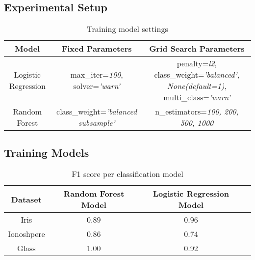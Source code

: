 \documentclass[english]{tktltiki2}
\theoremstyle{definition}
\theoremstyle{remark}
\begin{document}
\subsection{Experimental Setup}

\begin{table}[H]
	\caption{Training model settings}
	\label{tab:quantitative_experimentation_training_settings}
	\begin{center}
		\begin{tabular}{@{}ccc@{}}
			\toprule
			Model & Fixed Parameters & Grid Search Parameters \\ \hline
			
			\multicolumn{1}{|c|}{Logistic Regression} & \multicolumn{1}{p{40mm}|}{max\_iter=\textit{100}, solver=\textit{'warn'}} & \multicolumn{1}{p{40mm}|}{penalty=\textit{l2}, class\_weight=\textit{'balanced', None(default=1)}, multi\_class=\textit{'warn'}} \\ \hline
			
			\multicolumn{1}{|c|}{Random Forest} & \multicolumn{1}{p{40mm}|}{class\_weight=\textit{\textit{'balanced subsample'}}} & \multicolumn{1}{p{40mm}|}{n\_estimators=\textit{100, 200, 500, 1000}} \\ \hline

		\end{tabular}
	\end{center}
\end{table}

\subsection{Training Models}

\begin{table}[H]
	\caption{F1 score per classification model}
	\label{tab:quantitative_experimentation_learning_performance}
	\begin{center}
		\begin{tabular}{@{}cccc@{}}
			\toprule
			Dataset & Random Forest Model & Logistic Regression Model \\ \hline
			
			\multicolumn{1}{|c|}{Iris} & \multicolumn{1}{c|}{0.89} & \multicolumn{1}{c|}{0.96} \\ \hline
			
			\multicolumn{1}{|c|}{Ionoshpere} & \multicolumn{1}{c|}{0.86} & \multicolumn{1}{c|}{0.74} \\ \hline
			
			\multicolumn{1}{|c|}{Glass} & \multicolumn{1}{c|}{1.00} & \multicolumn{1}{c|}{0.92} \\ \hline
			
		\end{tabular}
	\end{center}
\end{table}
\end{document}
